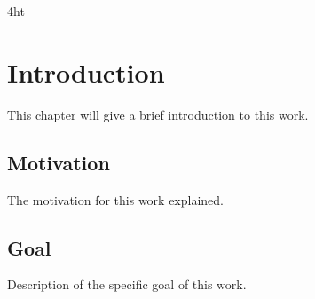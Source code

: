 \documentclass[
a4paper,
twoside,
bibliography=totoc,
headsepline,
cleardoublepage=empty,
parskip=half,
draft=false
]{scrbook}
\begin{document}
	\listoffigures
	\listoftables
	
	\ifdeutsch
	\else
	\fi
	
	\ifdeutsch
	\else
	\fi
	
	\printnoidxglossaries
	
	\iftex4ht
	\else
	\fi
	
	
	\renewcommand*{\chapterpagestyle}{scrplain}
	\pagestyle{scrheadings}
	\pagestyle{scrheadings}
	\ihead[]{}
	\chead[]{}
	\ohead[]{\headmark}
	\cfoot[]{}
	\ifoot[]{}

	
	\chapter{Introduction} \label{ch:introduction}
	
		This chapter will give a brief introduction to this work.
		
		\section{Motivation} \label{sec:motivation}
		
			The motivation for this work explained.
			
		\section{Goal} \label{sec:goal}
		
			Description of the specific goal of this work.
		
\end{document}
